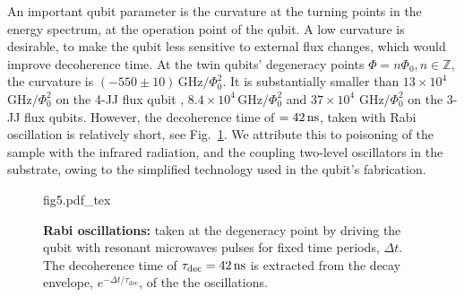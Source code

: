 An  important qubit  parameter is  the curvature  at the  turning points  in the
energy  spectrum, at  the operation  point  of the  qubit.  A  low curvature  is
desirable, to  make the  qubit less  sensitive to  external flux  changes, which
would  improve  decoherence  time.   At   the  twin  qubits'  degeneracy  points
$      \Phi     =      n\Phi_0,     n\in\mathbb{Z}      $,     the      curvature     is
$   (-550\pm10)\,\text{GHz}/\Phi_0^2  $.    It   is   substantially  smaller   than
$  13\times  10^4$ $  \text{GHz}/\Phi_0^2$  on  the  4-JJ flux  qubit  \cite{stern2014},
$   8.4  \times   10^4\,   \text{GHz}/\Phi_0^2$  \cite{zhu2010}   and   $  37\times   10^{4}$
$ \text{GHz}/\Phi_0^2$  \cite{gustavsson2012} on the 3-JJ  flux qubits.  However,  the decoherence time  of $  = 42\,\text{ns} $,  taken with
Rabi  oscillation   \cite{Bylander2011,Ithier2005,Martinis2003}  is  relatively
short, see  Fig.~\ref{fig:rabi}.  We attribute  this to poisoning of  the sample
with  the infrared  radiation, and  the  coupling two-level  oscillators in  the
substrate, owing to the simplified technology used in the qubit's fabrication.

\begin{figure}[h]
  \centering\def\svgwidth{8cm}{fig5.pdf_tex}
  \caption{\textbf{Rabi oscillations:}  taken at  the degeneracy point  by driving  the qubit
    with resonant microwaves pulses for fixed time periods, $ \Delta t $.  The decoherence time of
    $   \tau_{\text{dec}}  =   42\,\text{ns}  $   is   extracted  from   the  decay   envelope,
    $ e^{-\Delta t/\tau_{\text{dec}}} $, of the the oscillations. \label{fig:rabi}}
\end{figure}

